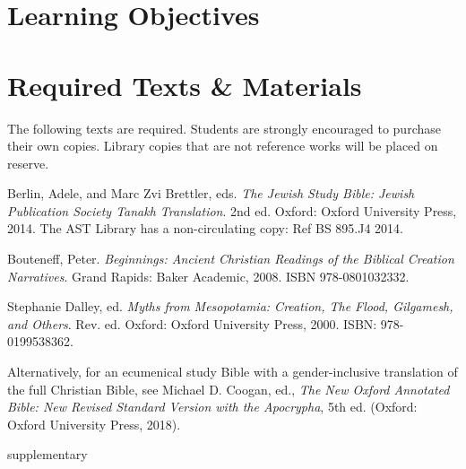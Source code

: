 \documentclass[titlepage]{article}
\newcommand\incl{../includes}
\begin{document}


  \section{Learning Objectives}
  \label{objectives}

  \edobject

\section{Required Texts \& Materials}
\label{texts}

The following texts are required. Students are strongly encouraged to
purchase their own copies. Library copies that are not reference works
will be placed on reserve.

\begingroup
\renewcommand{\section}[2]{}%
\begin{thebibliography}{Bouteneff}%

	 Berlin, Adele, and Marc Zvi Brettler, eds.
    \emph{The Jewish Study Bible: Jewish Publication Society Tanakh Translation}.
    2nd ed. Oxford: Oxford University Press, 2014.
    The AST Library has a non-circulating copy: Ref BS 895.J4 2014.

	 Bouteneff, Peter.
	\emph{Beginnings: Ancient Christian Readings of the Biblical Creation Narratives}.
	Grand Rapids: Baker Academic, 2008.
	ISBN 978-0801032332.

	 Stephanie Dalley, ed.
	\emph{Myths from Mesopotamia: Creation, The Flood, Gilgamesh, and Others}. Rev. ed.
	Oxford: Oxford University Press, 2000.
	ISBN: 978-0199538362.

\end{thebibliography}
\endgroup

Alternatively, for an ecumenical study Bible with a gender-inclusive
translation of the full Christian Bible, see Michael D. Coogan, ed.,
\emph{The New Oxford Annotated Bible: New Revised Standard Version with
the Apocrypha}, 5th ed. (Oxford: Oxford University Press, 2018).

\section{Supplementary Texts}
\label{supplementary}
\end{document}
